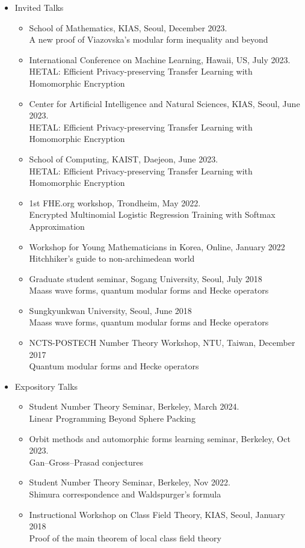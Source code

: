 \documentclass[letterpaper,11pt]{article}
\newlength{\outerbordwidth}
\newcommand{\resheading}[1]{\vspace{8pt}
  \parbox{\textwidth}{\setlength{\FrameSep}{\outerbordwidth}
    \begin{shaded}
\setlength{\fboxsep}{0pt}\framebox[\textwidth][l]{\setlength{\fboxsep}{4pt}\fcolorbox{shadecolorB}{shadecolorB}{\textbf{\sffamily{\mbox{~}\makebox[6.762in][l]{\large #1} \vphantom{p\^{E}}}}}}
    \end{shaded}
  }\vspace{-5pt}
}
\begin{document}
\resheading{Talks}
\begin{itemize}
	\item Invited Talks
	\begin{itemize}
		\item School of Mathematics, KIAS, Seoul, December 2023. \\
		A new proof of Viazovska's modular form inequality and beyond
		\item International Conference on Machine Learning, Hawaii, US, July 2023.\\
		HETAL: Efficient Privacy-preserving Transfer Learning with Homomorphic Encryption
		\item Center for Artificial Intelligence and Natural Sciences, KIAS, Seoul, June 2023.\\
		HETAL: Efficient Privacy-preserving Transfer Learning with Homomorphic Encryption
		\item School of Computing, KAIST, Daejeon, June 2023. \\
		HETAL: Efficient Privacy-preserving Transfer Learning with Homomorphic Encryption
		\item 1st FHE.org workshop, Trondheim, May 2022.\\
		Encrypted Multinomial Logistic Regression Training with Softmax Approximation
		\item Workshop for Young Mathematicians in Korea, Online, January 2022 \\
		Hitchhiker's guide to non-archimedean world
		\item Graduate student seminar, Sogang University, Seoul, July 2018\\
		Maass wave forms, quantum modular forms and Hecke operators
		\item Sungkyunkwan University, Seoul, June 2018\\
		Maass wave forms, quantum modular forms and Hecke operators
		\item NCTS-POSTECH Number Theory Workshop, NTU, Taiwan, December 2017\\ Quantum modular forms and Hecke operators
	\end{itemize}
	\item Expository Talks
	\begin{itemize}
		\item Student Number Theory Seminar, Berkeley, March 2024.\\
		Linear Programming Beyond Sphere Packing
		\item Orbit methods and automorphic forms learning seminar, Berkeley, Oct 2023. \\
		Gan--Gross--Prasad conjectures
		\item Student Number Theory Seminar, Berkeley, Nov 2022.\\
		Shimura correspondence and Waldspurger's formula
		\item Instructional Workshop on Class Field Theory, KIAS, Seoul, January 2018\\
		Proof of the main theorem of local class field theory
	\end{itemize}
\end{itemize}
\end{document}
